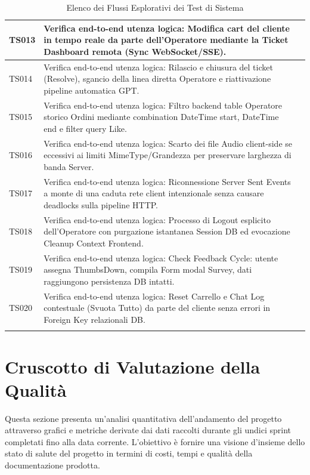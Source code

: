 \documentclass[a4paper,11pt,oneside]{scrartcl}
\begin{document}
\begin{longtable}{|p{1.9cm}|p{11.6cm}|c|}
TS013 & Verifica end-to-end utenza logica: Modifica cart del cliente in tempo reale da parte dell'Operatore mediante la Ticket Dashboard remota (Sync WebSocket/SSE). & \\ \hline
TS014 & Verifica end-to-end utenza logica: Rilascio e chiusura del ticket (Resolve), sgancio della linea diretta Operatore e riattivazione pipeline automatica GPT. & \\ \hline
TS015 & Verifica end-to-end utenza logica: Filtro backend table Operatore storico Ordini mediante combination DateTime start, DateTime end e filter query Like. & \\ \hline
TS016 & Verifica end-to-end utenza logica: Scarto dei file Audio client-side se eccessivi ai limiti MimeType/Grandezza per preservare larghezza di banda Server. & \\ \hline
TS017 & Verifica end-to-end utenza logica: Riconnessione Server Sent Events a monte di una caduta rete client intenzionale senza causare deadlocks sulla pipeline HTTP. & \\ \hline
TS018 & Verifica end-to-end utenza logica: Processo di Logout esplicito dell'Operatore con purgazione istantanea Session DB ed evocazione Cleanup Context Frontend. & \\ \hline
TS019 & Verifica end-to-end utenza logica: Check Feedback Cycle: utente assegna ThumbsDown, compila Form modal Survey, dati raggiungono persistenza DB intatti. & \\ \hline
TS020 & Verifica end-to-end utenza logica: Reset Carrello e Chat Log contestuale (Svuota Tutto) da parte del cliente senza errori in Foreign Key relazionali DB. & \\ \hline
\caption{Elenco dei Flussi Esplorativi dei Test di Sistema}
\end{longtable}


\newpage
\section{Cruscotto di Valutazione della Qualità}

Questa sezione presenta un'analisi quantitativa dell'andamento del progetto attraverso grafici e metriche derivate dai dati raccolti durante gli undici sprint completati fino alla data corrente. L'obiettivo è fornire una visione d'insieme dello stato di salute del progetto in termini di costi, tempi e qualità della documentazione prodotta.
\end{document}
